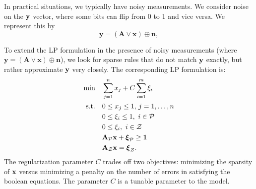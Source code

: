 In practical situations, we typically have noisy measurements. 
We consider noise on the $\mathbf{y}$ vector, where some bits can flip from 
$0$ to $1$ and vice versa. We represent this by 
\begin{equation}
\label{eq:noisyforwardtest}
	\mathbf{y} = (\mathbf{A} \lor \mathbf{x}) \oplus \mathbf{n},
\end{equation}

To extend the LP formulation in the presence of noisy measurements (where $\mathbf{y} = (\mathbf{A} \lor \mathbf{x}) \oplus \mathbf{n}$), we look
for sparse rules that do not match $\mathbf{y}$ exactly, but rather approximate 
$\mathbf{y}$ very closely. The corresponding LP formulation is:
\begin{align}
\label{eq:booleanl1minLPslack}
	\min\quad &\sum_{j=1}^{n} x_j + C\sum_{i=1}^{m}\xi_i\\
	\textrm{s.t.\quad} & 0 \le x_j \le 1,\,j = 1,\ldots,n\nonumber\\
		& 0 \le \xi_i \le 1, ~i \in \mathcal{P} \nonumber\\
		& 0 \le \xi_i, ~i \in \mathcal{Z}\nonumber\\
		& \mathbf{A}_{\mathcal{P}}\mathbf{x} + \boldsymbol{\xi}_{\mathcal{P}} \ge \mathbf{1}\nonumber\\
		& \mathbf{A}_{\mathcal{Z}}\mathbf{x} = \boldsymbol{\xi}_{\mathcal{Z}}.\nonumber
\end{align}
The regularization parameter $C$ trades off two objectives: minimizing the sparsity of $\mathbf{x}$ versus minimizing a penalty on the number of errors in satisfying the boolean equations. The parameter $C$ is a tunable parameter to the model.



